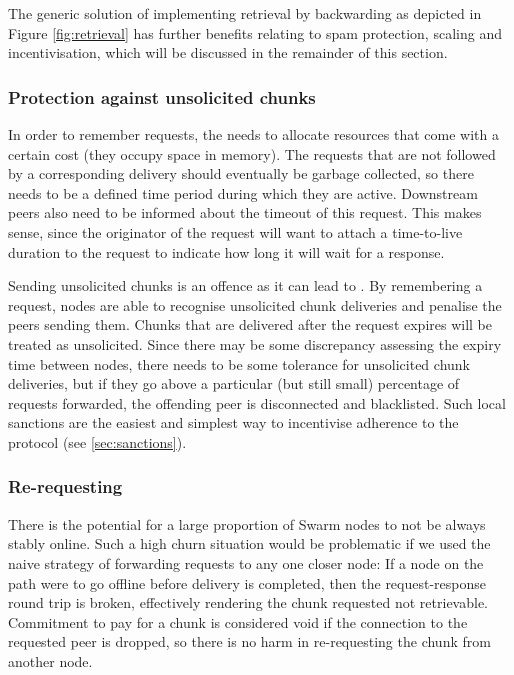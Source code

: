 The generic solution of implementing retrieval by backwarding as depicted in Figure \ref{fig:retrieval} has further benefits relating to spam protection, scaling and incentivisation, which will be discussed in the remainder of this section.

\subsubsection{Protection against unsolicited chunks}

In order to remember requests, the  needs to allocate resources that come with a certain cost (they occupy space in memory). The requests that are not followed by a corresponding delivery should eventually be garbage collected, so there needs to be a defined time period during which they are active. Downstream peers also need to be informed about the timeout of this request. This makes sense, since the originator of the request will want to attach a time-to-live duration to the request to indicate how long it will wait for a response.  

Sending unsolicited chunks is an offence as it can lead to . By remembering a request, nodes are able to recognise unsolicited chunk deliveries and penalise the peers sending them. Chunks that are delivered after the request expires will be treated as unsolicited. Since there may be some discrepancy assessing the expiry time between nodes, there needs to be some tolerance for unsolicited chunk deliveries, but if they go above a particular (but still small) percentage of requests forwarded, the offending peer is disconnected and blacklisted. Such local sanctions are the easiest and simplest way to incentivise adherence to the protocol (see \ref{sec:sanctions}). 

\subsubsection{Re-requesting}

There is the potential for a large proportion of Swarm nodes to not be always stably online. Such a high churn situation would be problematic if we used the naive strategy of forwarding requests to any one closer node: If a node on the path were to go offline before delivery is completed, then the request-response round trip is broken, effectively rendering the chunk requested not retrievable. Commitment to pay for a chunk is considered void if the connection to the requested peer is dropped, so there is no harm in re-requesting the chunk from another node.


